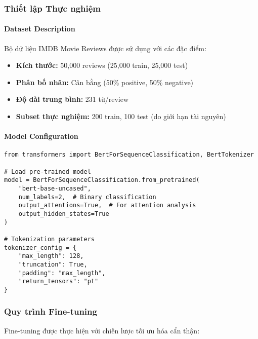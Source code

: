 \subsubsection{Thiết lập Thực nghiệm}

\paragraph{Dataset Description}
Bộ dữ liệu IMDB Movie Reviews \cite{maas2011learning} được sử dụng với các đặc điểm:
\begin{itemize}
    \item \textbf{Kích thước:} 50,000 reviews (25,000 train, 25,000 test)
    \item \textbf{Phân bố nhãn:} Cân bằng (50\% positive, 50\% negative)  
    \item \textbf{Độ dài trung bình:} 231 từ/review
    \item \textbf{Subset thực nghiệm:} 200 train, 100 test (do giới hạn tài nguyên)
\end{itemize}

\paragraph{Model Configuration}
\begin{verbatim}
from transformers import BertForSequenceClassification, BertTokenizer

# Load pre-trained model
model = BertForSequenceClassification.from_pretrained(
    "bert-base-uncased",
    num_labels=2,  # Binary classification
    output_attentions=True,  # For attention analysis
    output_hidden_states=True
)

# Tokenization parameters
tokenizer_config = {
    "max_length": 128,
    "truncation": True,
    "padding": "max_length",
    "return_tensors": "pt"
}
\end{verbatim}

\subsubsection{Quy trình Fine-tuning}

Fine-tuning được thực hiện với chiến lược tối ưu hóa cẩn thận:

